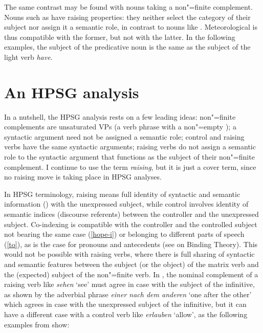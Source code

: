The same contrast may be found with  nouns taking a non"=finite complement. Nouns such as  have raising properties: they neither select the category of their subject nor assign it a semantic role, in contrast to nouns like . Meteorological  is thus compatible with the former, but not with the latter. In the following examples, the subject of the predicative noun is the same as the subject of the light verb \emph{have}.


\eal
{}
\zl

\section{An HPSG analysis}


In a nutshell, the HPSG analysis rests on a few leading ideas: non"=finite complements are
unsaturated VPs (a verb phrase with a non"=empty \subjl); a syntactic argument need not be assigned
a semantic role; control and raising verbs have the same syntactic arguments; raising verbs do not
assign a semantic role to the syntactic argument that functions as the subject of their non"=finite
complement. 
I continue to use the term \emph{raising}, but it is just a cover term, since no raising move
is taking place in HPSG analyses.

In HPSG terminology, raising means full identity of syntactic and semantic
information () \crossrefchapterp[\pageref{ex:prop22}--\pageref{ex:prop24}]{properties} with the unexpressed subject, while
control involves identity of semantic indices (discourse referents) between the controller and the
unexpressed subject. Co-indexing is compatible with the controller and the controlled subject not
bearing the same case (\ref{hope-i}) or belonging to different parts of speech (\ref{to}), as is the
case for pronouns and antecedents (see  on Binding Theory). This would not be possible
with raising verbs, where there is full sharing of syntactic and semantic features between the
subject (or the object) of the matrix verb and the (expected) subject of the non"=finite verb. In
, the nominal complement of a raising verb like \emph{sehen} `see' must agree in case
with the subject of the infinitive, as shown by the adverbial phrase \emph{einer nach dem anderen} `one after the other' which
agrees in case with the unexpressed subject of the infinitive, but it can have a different case with
a control verb like \emph{erlauben} `allow', as the following examples from  show: 


